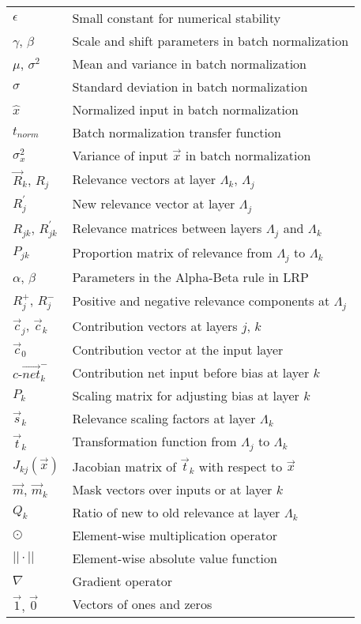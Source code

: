 \documentclass[12pt]{muthesis}
\newcommand{\net}[1][k]{\vec{net}_{#1}}
\theoremstyle{definition}
\newcommand{\cnet}[1][k]{\text{$c$-}\net[#1]}
\begin{document}
\begin{longtable}{p{} p{}}
$\epsilon$ & Small constant for numerical stability \\
$\gamma$, $\beta$ & Scale and shift parameters in batch normalization \\
$\mu$, $\sigma^2$ & Mean and variance in batch normalization \\
$\sigma$ & Standard deviation in batch normalization \\
$\hat{x}$ & Normalized input in batch normalization \\
$t_{norm}$ & Batch normalization transfer function \\
$\sigma_x^2$ & Variance of input $\vec{x}$ in batch normalization \\
$\vec{R}_k$, $R_j$ & Relevance vectors at layer $\Lambda_k$, $\Lambda_j$ \\
$R_j^\prime$ & New relevance vector at layer $\Lambda_j$ \\
$R_{jk}$, $R_{jk}^\prime$ & Relevance matrices between layers $\Lambda_j$ and $\Lambda_k$ \\
$P_{jk}$ & Proportion matrix of relevance from $\Lambda_j$ to $\Lambda_k$ \\
$\alpha$, $\beta$ & Parameters in the Alpha-Beta rule in LRP \\
$R_j^+$, $R_j^-$ & Positive and negative relevance components at $\Lambda_j$ \\
$\vec{c}_j$, $\vec{c}_k$ & Contribution vectors at layers $j$, $k$ \\
$\vec{c}_0$ & Contribution vector at the input layer \\
$\cnet^-$ & Contribution net input before bias at layer $k$ \\
$P_k$ & Scaling matrix for adjusting bias at layer $k$ \\
$\vec{s}_k$ & Relevance scaling factors at layer $\Lambda_k$ \\
$\vec{t}_k$ & Transformation function from $\Lambda_j$ to $\Lambda_k$ \\
$J_{kj}(\vec{x})$ & Jacobian matrix of $\vec{t}_k$ with respect to $\vec{x}$ \\
$\vec{m}$, $\vec{m}_k$ & Mask vectors over inputs or at layer $k$ \\
$Q_k$ & Ratio of new to old relevance at layer $\Lambda_k$ \\
$\odot$ & Element-wise multiplication operator \\
$||\cdot||$ & Element-wise absolute value function \\
$\nabla$ & Gradient operator \\
$\vec{1}$, $\vec{0}$ & Vectors of ones and zeros \\
\end{longtable}
\end{document}
